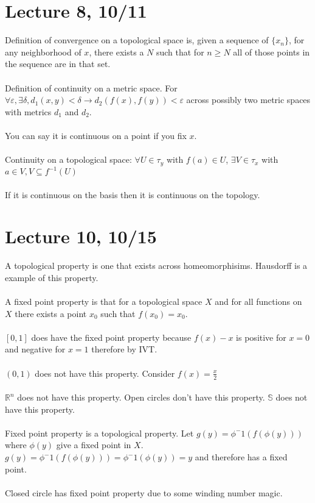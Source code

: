 \documentclass[12pt]{article}
\begin{document}
\section{Lecture 8, 10/11}
Definition of convergence on a topological space is, given a sequence of $\{x_n\}$, for any neighborhood of $x$, there exists a $N$ such that for $n \geq N$ all of those points in the sequence are in that set. \\\\
Definition of continuity on a metric space. For $\forall \varepsilon, \exists \delta, d_1(x,y) < \delta \longrightarrow d_2(f(x),f(y)) < \varepsilon$ across possibly two metric spaces with metrics $d_1$ and $d_2$.\\\\
You can say it is continuous on a point if you fix $x$. \\\\
Continuity on a topological space: $\forall U \in \tau_y$ with $f(a) \in U$, $\exists V \in \tau_x$ with $a \in V, V \subseteq f^{-1}(U)$\\\\
If it is continuous on the basis then it is continuous on the topology. 

\section{Lecture 10, 10/15}
A topological property is one that exists across homeomorphisims. Hausdorff is a example of this property. \\\\
A fixed point property is that for a topological space $X$ and for all functions on $X$ there exists a point $x_0$ such that $f(x_0) = x_0$. \\\\
$[0,1]$ does have the fixed point property because $f(x) - x$ is positive for $x = 0$ and negative for $x = 1$ therefore by IVT. \\\\
$(0,1)$ does not have this property. Consider $f(x) = \frac{x}{2}$\\\\
$\mathbb{R}^n$ does not have this property. Open circles don't have this property. $\mathbb{S}$ does not have this property. \\\\
Fixed point property is a topological property. Let $g(y) = \phi^-1(f(\phi(y)))$ where $\phi(y)$ give a fixed point in $X$. $g(y) = \phi^-1(f(\phi(y))) = \phi^-1(\phi(y)) = y$ and therefore has a fixed point. \\\\
Closed circle has fixed point property due to some winding number magic. 
\end{document}
